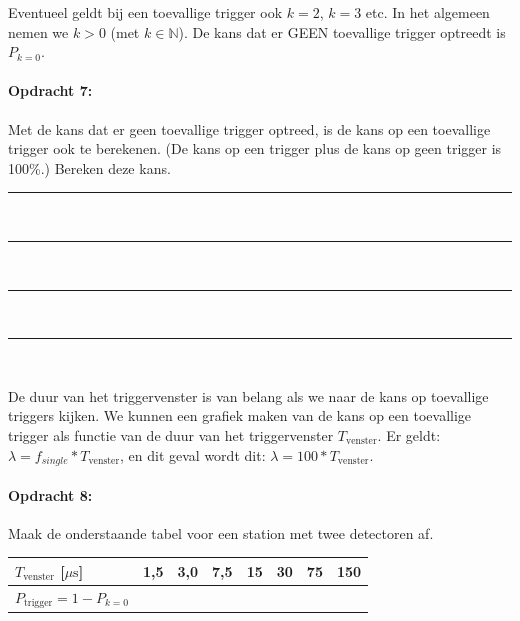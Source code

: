 \bigskip{}

Eventueel geldt bij een toevallige trigger ook $k=2$, $k=3$ etc.
In het algemeen nemen we $k>0$ (met $k\mathbb{\in N}$). De kans
dat er GEEN toevallige trigger optreedt is $P_{k=0}$.

\begin{minipage}[t]{1\columnwidth}%

\paragraph{Opdracht 7:}

Met de kans dat er geen toevallige trigger optreed, is de
kans op een toevallige trigger ook te berekenen. (De kans op een trigger
plus de kans op geen trigger is 100\%.) Bereken deze kans.

\begin{center}
    \rule{\textwidth}{0.3mm}\\
    \rule{\textwidth}{0.3mm}\\
    \rule{\textwidth}{0.3mm}\\
    \rule{\textwidth}{0.3mm}\\
\end{center}
\end{minipage}

\bigskip{}

De duur van het triggervenster is van belang als we naar de kans op
toevallige triggers kijken. We kunnen een grafiek maken van de kans
op een toevallige trigger als functie van de duur van het triggervenster
$T_\textrm{venster}$. Er geldt: $\lambda=f_{single}*T_\textrm{venster}$, en dit
geval wordt dit: $\lambda=100*T_\textrm{venster}$$ $.

\begin{minipage}[t]{1\columnwidth}%

\paragraph{Opdracht 8:}

Maak de onderstaande tabel voor een station met twee detectoren
af.

\bigskip{}


\begin{tabular}{|x{.20\textwidth}|x{.07\textwidth}|x{.07\textwidth}
                |x{.07\textwidth}|x{.07\textwidth}|x{.07\textwidth}
                |x{.07\textwidth}|x{.07\textwidth}|}
    \hline
    $T_\textrm{venster}$ {[}$\mu\mathrm{s}${]} & 1,5 & 3,0 & 7,5 & 15 & 30 & 75 & 150\tabularnewline
    \hline
    $P_\textrm{trigger}=1-P_{k=0}$ &  &  &  &  &  &  & \tabularnewline
    \hline
\end{tabular}
\end{minipage}


